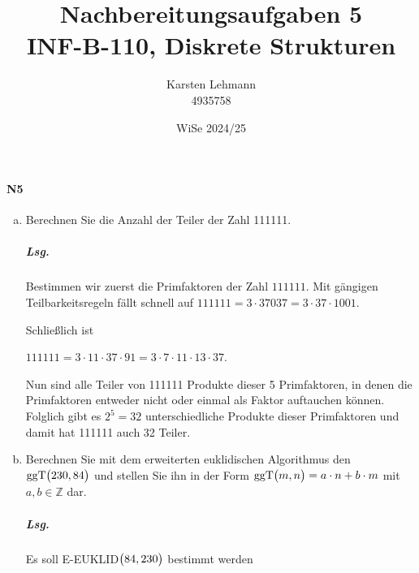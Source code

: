 \documentclass{scrreprt}
\author{Karsten Lehmann \\ 4935758}
\date{WiSe 2024/25}
\title{Nachbereitungsaufgaben 5\\INF-B-110, Diskrete Strukturen}
\newcommand{\ggT}[0]{\text{ggT}}
\DeclarePairedDelimiter{\floor}{\lfloor}{\rfloor}
\begin{document}
\paragraph{N5}
\begin{enumerate}[(a)]
\item Berechnen Sie die Anzahl der Teiler der Zahl 111111.

  \subparagraph{Lsg.} Bestimmen wir zuerst die Primfaktoren der Zahl
  $111111$.
  Mit gängigen Teilbarkeitsregeln fällt schnell auf
  $111111 = 3 \cdot 37037 = 3 \cdot 37 \cdot 1001$.

  Schließlich ist

  $111111 = 3 \cdot 11 \cdot 37 \cdot 91 = 3 \cdot 7 \cdot 11 \cdot 13 \cdot 37$.

  Nun sind alle Teiler von 111111 Produkte dieser 5 Primfaktoren, in denen die
  Primfaktoren entweder nicht oder einmal als Faktor auftauchen können.
  Folglich gibt es $2^5 = 32$ unterschiedliche Produkte dieser Primfaktoren und
  damit hat 111111 auch 32 Teiler.

\item Berechnen Sie mit dem erweiterten euklidischen Algorithmus den
  $\ggT\qty\big(230, 84)$ und stellen Sie ihn in der Form
  $\ggT\qty\big(m, n) = a \cdot n + b \cdot m$ mit
  $a, b \in \mathbb{Z}$ dar.

  \subparagraph{Lsg.} Es soll E-EUKLID$\qty\big(84, 230)$ bestimmt werden

\end{enumerate}
\end{document}
